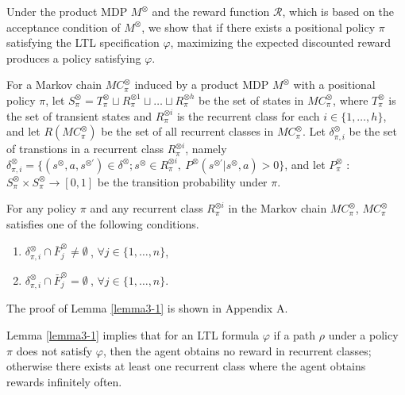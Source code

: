 Under the product MDP $M^{\otimes}$ and the reward function $\mathcal{R}$, which is based on the acceptance condition of $ M^\otimes $, we show that if there exists a positional policy $\pi$ satisfying the LTL specification $\varphi$, maximizing the expected discounted reward produces a policy satisfying $\varphi$.

For a Markov chain $MC^{\otimes}_{\pi}$ induced by a product MDP $M^{\otimes}$ with a positional policy $\pi$, let $S^{\otimes}_{\pi}= T^{\otimes}_{\pi} \sqcup R^{\otimes 1}_{\pi} \sqcup \ldots \sqcup R^{\otimes h}_{\pi}$ be the set of states in $MC^{\otimes}_{\pi}$, where $T^{\otimes}_{\pi}$ is the set of transient states and $R^{\otimes i}_{\pi}$ is the recurrent class for each $i \in \{ 1, \ldots ,h \}$, and let $R(MC^{\otimes}_{\pi})$ be the set of all recurrent classes in $MC^{\otimes}_{\pi}$. Let $\delta^{\otimes}_{\pi,i}$ be the set of transtions in a recurrent class $R^{\otimes i}_{\pi}$, namely $\delta^{\otimes}_{\pi,i} = \{ (s^{\otimes},a,s^{\otimes \prime}) \in \delta^{\otimes} ; s^{\otimes} \in R^{\otimes i}_{\pi},\ P^{\otimes}(s^{\otimes \prime}|s^{\otimes},a) > 0 \}$, and let $P^{\otimes}_{\pi}$ : $S^{\otimes}_{\pi} \times S^{\otimes}_{\pi} \rightarrow [0,1]$ be the transition probability under $\pi$.

\begin{lemma}
  For any policy $\pi$ and any recurrent class $R^{\otimes i}_{\pi}$ in the Markov chain $MC^{\otimes}_{\pi}$,
  $MC^{\otimes}_{\pi}$ satisfies one of the following conditions.
  \vspace{2mm}
  \begin{enumerate}
    \item $\delta^{\otimes}_{\pi,i} \cap \bar{F}^{\otimes}_j \neq \emptyset\ $, $ \forall j \in \{ 1, \ldots ,n \}$,
    \item $\delta^{\otimes}_{\pi,i} \cap \bar{F}^{\otimes}_j = \emptyset\ $, $ \forall j \in \{ 1, \ldots ,n \}$.
  \end{enumerate}
  \label{lemma3-1}
\end{lemma}
The proof of Lemma \ref{lemma3-1} is shown in Appendix A.

Lemma \ref{lemma3-1} implies that for an LTL formula $\varphi$ if a path $\rho$ under a policy $\pi$ does not satisfy $\varphi$, then the agent obtains no reward in recurrent classes; otherwise there exists at least one recurrent class where the agent obtains rewards infinitely often.

